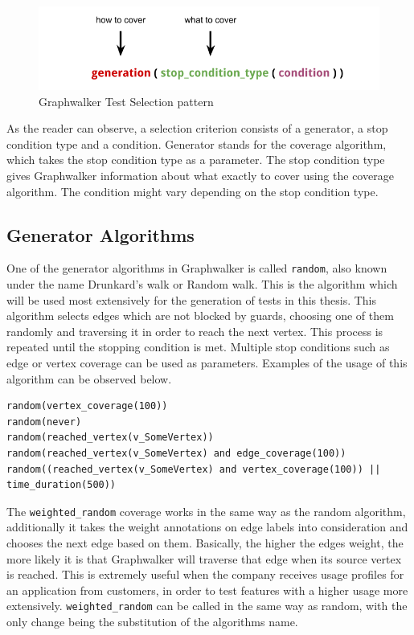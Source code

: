 \begin{figure} [htbp!]
\centering
					\includegraphics[width=1\textwidth]{figures/Graphwalker_testselection_example.png}
					\caption{\label{Fig:raphwalker_testselection_example} Graphwalker Test Selection pattern}
\end{figure}
\par
As the reader can observe, a selection criterion consists of a generator, a stop condition type and a condition. Generator stands for the coverage algorithm, which takes the stop condition type as a parameter. The stop condition type gives Graphwalker information about what exactly to cover using the coverage algorithm. The condition might vary depending on the stop condition type.

\subsection{Generator Algorithms}
\par
One of the generator algorithms in Graphwalker is called \texttt{random}, also known under the name Drunkard's walk or Random walk. This is the algorithm which will be used most extensively for the generation of tests in this thesis. This algorithm selects edges which are not blocked by guards, choosing one of them randomly and traversing it in order to reach the next vertex. This process is repeated until the stopping condition is met. Multiple stop conditions such as edge or vertex coverage can be used as parameters. Examples of the usage of this algorithm can be observed below. 
\begin{lstlisting}
random(vertex_coverage(100))
random(never)
random(reached_vertex(v_SomeVertex))
random(reached_vertex(v_SomeVertex) and edge_coverage(100))
random((reached_vertex(v_SomeVertex) and vertex_coverage(100)) || time_duration(500))
\end{lstlisting}

\par
The \texttt{weighted\_random} coverage works in the same way as the random algorithm, additionally it takes the weight annotations on edge labels into consideration and chooses the next edge based on them. Basically, the higher the edges weight, the more likely it is that Graphwalker will traverse that edge when its source vertex is reached. This is extremely useful when the company receives usage profiles for an application from customers, in order to test features with a higher usage more extensively. \texttt{weighted\_random} can be called in the same way as random, with the only change being the substitution of the algorithms name.

